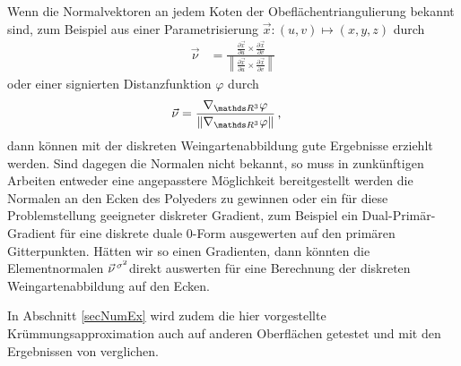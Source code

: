     \begin{fazit}
      Wenn die Normalvektoren an jedem Koten der Obeflächentriangulierung bekannt sind, zum Beispiel aus einer Parametrisierung
      \( \vec{x}: \left( u,v \right) \mapsto \left( x,y,z \right)\) durch
      \begin{align}
        \vec{\nu} &= \frac{\frac{\partial\vec{x}}{\partial u} \times \frac{\partial\vec{x}}{\partial v}}
                             {\left\| \frac{\partial\vec{x}}{\partial u} \times \frac{\partial\vec{x}}{\partial v} \right\|}
      \end{align}
      oder einer signierten Distanzfunktion \( \varphi \) durch
      \begin{align}
        \label{eqNormalsFromSignDist}
        \vec{\nu} &= \frac{\nabla_{\R^{3}}\varphi}{\left\| \nabla_{\R^{3}}\varphi \right\|} \formkomma
      \end{align}
      dann können mit der diskreten Weingartenabbildung gute Ergebnisse erziehlt werden.
      Sind dagegen die Normalen nicht bekannt, so muss in zunkünftigen Arbeiten entweder eine angepasstere Möglichkeit bereitgestellt
      werden die Normalen an den Ecken des Polyeders zu gewinnen oder ein für diese Problemstellung geeigneter diskreter Gradient,
      zum Beispiel ein Dual-Primär-Gradient für eine diskrete duale \( 0 \)-Form ausgewerten auf den primären Gitterpunkten.
      Hätten wir so einen Gradienten, dann könnten die Elementnormalen \( \vec{\nu}^{\,\sigma^{2}} \)direkt auswerten für eine
      Berechnung der diskreten Weingartenabbildung auf den Ecken.

      In Abschnitt \ref{secNumEx} wird zudem die hier vorgestellte Krümmungsapproximation auch auf anderen Oberflächen getestet und mit den
      Ergebnissen von \cite{heine} verglichen.
    \end{fazit}



